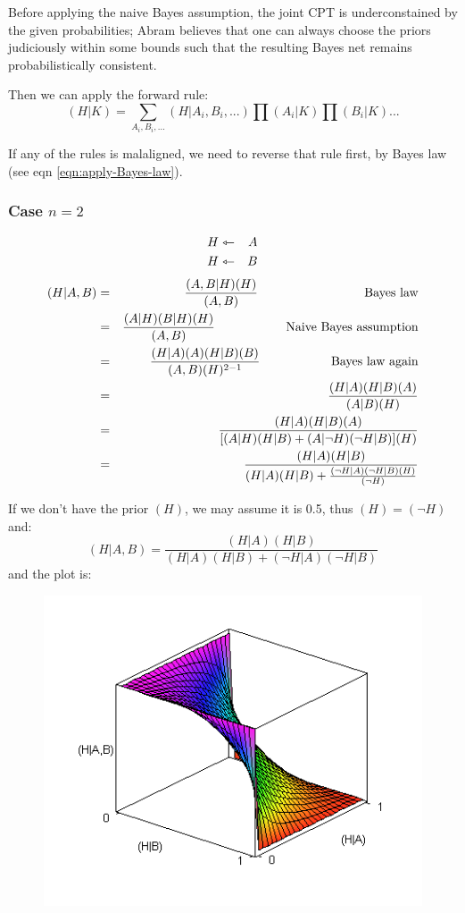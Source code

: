 Before applying the naive Bayes assumption, the joint CPT is underconstained by the given
probabilities;  Abram believes that one can always choose the priors judiciously within some
bounds such that the resulting Bayes net remains probabilistically consistent.

Then we can apply the forward rule:
$$ (H|K) = \sum_{A_i,B_i,...} (H|A_i,B_i,...) \prod (A_i|K) \prod (B_i|K) ... $$

If any of the rules is malaligned, we need to reverse that rule first, by Bayes law
(see eqn \ref{eqn:apply-Bayes-law}).

\subsubsection{Case $n=2$}
\begin{eqnarray}
H &\leftarrowtriangle& A \nonumber \\
H &\leftarrowtriangle& B \nonumber
\end{eqnarray}
\begin{eqnarray}
(H|A,B) &=& \frac{ (A,B|H)(H) } { (A,B) } \tab\tab\tab \mbox{Bayes law} \nonumber \\
 &=& \frac{ (A|H) (B|H) (H) }{ (A,B) } \tab\tab \mbox{Naive Bayes assumption} \nonumber \\
 &=& \frac{ (H|A) (A) (H|B) (B) }{ (A,B) (H)^{2-1} } \tab\tab \mbox{Bayes law again} \nonumber \\
 &=& \frac{ (H|A) (H|B) (A) }{ (A|B) (H) } \nonumber \\
 &=& \frac{ (H|A) (H|B) (A) }{ [ (A|H)(H|B) + (A|\neg H)(\neg H|B) ] (H) } \nonumber \\
 &=& \frac{ (H|A) (H|B) }{ (H|A)(H|B) + \frac{(\neg H|A)(\neg H|B)(H)}{(\neg H)} } \nonumber
\end{eqnarray}

If we don't have the prior $(H)$, we may assume it is 0.5, thus $(H)=(\neg H)$ and:
$$ (H|A,B) = \frac{ (H|A) (H|B) }{ (H|A)(H|B) + (\neg H|A)(\neg H|B) } \nonumber $$
and the plot is:
\begin{figure}[H]
\centering
\includegraphics{Abrams-rule-plot.png}
\end{figure}

